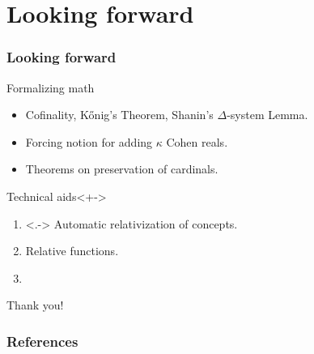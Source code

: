 \documentclass[english]{beamer}
\begin{document}
\subsection{}

\begin{frame}
  \frametitle{}
\end{frame}

\section{}
\subsection{}

\begin{frame}
  \frametitle{}
\end{frame}

\section{Looking forward}

\begin{frame}
  \frametitle{Looking forward}
  \begin{block}{Formalizing math}
    \begin{itemize}
    \item<+-> Cofinality, K\H{o}nig's Theorem, Shanin's $\Delta$-system Lemma.
    \item<+-> Forcing notion for adding $\kappa$ Cohen reals.
    \item<+-> Theorems on preservation of cardinals.
    \end{itemize}
  \end{block}
  \begin{block}{Technical aids}<+->
    \begin{enumerate}
    \item<.-> Automatic relativization of concepts.
    \item<+-> Relative functions.
    \item<+->
    \end{enumerate}
  \end{block}
\end{frame}

\begin{frame}
  \begin{shadowblock}{}
    \begin{center}
      {\Huge Thank you!}
    \end{center}
  \end{shadowblock}
\end{frame}

\begin{frame}
  \frametitle{References}
  
  
\end{frame}
\end{document}
